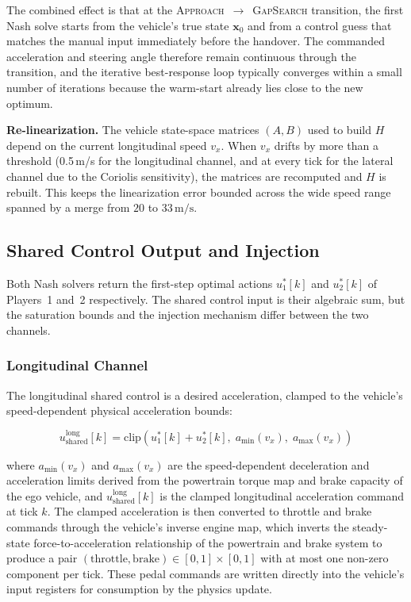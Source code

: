 \documentclass[12pt,a4paper,oneside]{report}
\begin{document}
The combined effect is that at the \textsc{Approach}~$\to$~\textsc{GapSearch} transition, the first Nash solve starts from the vehicle's true state $\mathbf{x}_0$ and from a control guess that matches the manual input immediately before the handover. The commanded acceleration and steering angle therefore remain continuous through the transition, and the iterative best-response loop typically converges within a small number of iterations because the warm-start already lies close to the new optimum.

\textbf{Re-linearization.} The vehicle state-space matrices $(A, B)$ used to build $H$ depend on the current longitudinal speed $v_x$. When $v_x$ drifts by more than a threshold (0.5\,m/s for the longitudinal channel, and at every tick for the lateral channel due to the Coriolis sensitivity), the matrices are recomputed and $H$ is rebuilt. This keeps the linearization error bounded across the wide speed range spanned by a merge from $20$ to $33\,\mathrm{m/s}$.

\subsection{Shared Control Output and Injection}
\label{sec:nash_output}

Both Nash solvers return the first-step optimal actions $u_1^{*}[k]$ and $u_2^{*}[k]$ of Players~1 and~2 respectively. The shared control input is their algebraic sum, but the saturation bounds and the injection mechanism differ between the two channels.

\subsubsection{Longitudinal Channel}

The longitudinal shared control is a desired acceleration, clamped to the vehicle's speed-dependent physical acceleration bounds:

\begin{equation}
u_{\mathrm{shared}}^{\mathrm{long}}[k] = \mathrm{clip}\!\left(u_1^{*}[k] + u_2^{*}[k],\; a_{\min}(v_x),\; a_{\max}(v_x)\right)
\label{eq:nash_ushared_long}
\end{equation}

where $a_{\min}(v_x)$ and $a_{\max}(v_x)$ are the speed-dependent deceleration and acceleration limits derived from the powertrain torque map and brake capacity of the ego vehicle, and $u_{\mathrm{shared}}^{\mathrm{long}}[k]$ is the clamped longitudinal acceleration command at tick $k$. The clamped acceleration is then converted to throttle and brake commands through the vehicle's inverse engine map, which inverts the steady-state force-to-acceleration relationship of the powertrain and brake system to produce a pair $(\mathrm{throttle}, \mathrm{brake}) \in [0, 1] \times [0, 1]$ with at most one non-zero component per tick. These pedal commands are written directly into the vehicle's input registers for consumption by the physics update.
\end{document}

